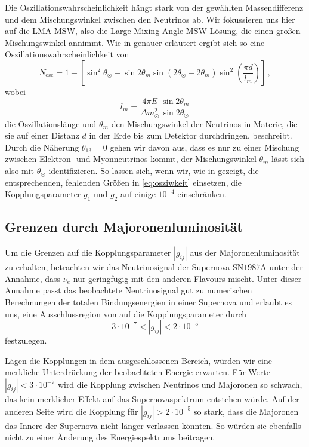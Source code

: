 Die Oszillationswahrscheinlichkeit hängt stark von der gewählten Massendifferenz und dem Mischungswinkel zwischen den Neutrinos ab.
Wir fokussieren uns hier auf die LMA-MSW, also die Large-Mixing-Angle MSW-Lösung, die einen großen Mischungswinkel annimmt.
Wie in \cite{ueberlebenswkeit} genauer erläutert ergibt sich so eine Oszillationswahrscheinlichkeit von
\begin{equation}
    N_\text{osc} = 1 - \left[\sin^2\theta_\odot - \sin 2\theta_m \sin\left(2\theta_\odot - 2 \theta_m\right) \sin^2 \left(\frac{\pi d}{l_m}\right)\right] \,,
    \label{eq:osziwkeit}
\end{equation}
wobei
\begin{equation*}
    l_m = \frac{4 \pi E}{\Delta m^2_\odot} \frac{\sin2\theta_m}{\sin2\theta_\odot}
\end{equation*}
die Oszillationslänge und $\theta_m$ den Mischungswinkel der Neutrinos in Materie, die sie auf einer Distanz $d$ in der Erde bis zum Detektor durchdringen, beschreibt.
Durch die Näherung $\theta_{1 3} = 0$ gehen wir davon aus, dass es nur zu einer Mischung zwischen Elektron- und Myonneutrinos kommt, der Mischungswinkel $\theta_m$ lässt sich also mit $\theta_\odot$ identifizieren.
So lassen sich, wenn wir, wie in \cite{supernovaboundsdasandere} gezeigt, die entsprechenden, fehlenden Größen in \eqref{eq:osziwkeit} einsetzen, die Kopplungsparameter $g_1$ und $g_2$ auf einige $10^{-4}$ einschränken.

\subsection{Grenzen durch Majoronenluminosität}

Um die Grenzen auf die Kopplungsparameter $|g_{i j}|$ aus der Majoronenluminosität zu erhalten, betrachten wir das Neutrinosignal der Supernova SN$1987$A unter der Annahme, dass $\nu_e$ nur geringfügig mit den anderen Flavours mischt.
Unter dieser Annahme passt das beobachtete Neutrinosignal gut zu numerischen Berechnungen der totalen Bindungsenergien in einer Supernova und erlaubt es uns, eine Ausschlussregion von auf die Kopplungsparameter durch
\begin{equation}
    3 \cdot 10^{-7} < |g_{i j}| < 2 \cdot 10^{-5} %
    \label{eq:gijlimit}
\end{equation}
festzulegen.

Lägen die Kopplungen in dem ausgeschlossenen Bereich, würden wir eine merkliche Unterdrückung der beobachteten Energie erwarten.
Für Werte $|g_{i j}| < 3 \cdot 10^{-7}$ wird die Kopplung zwischen Neutrinos und Majoronen so schwach, das kein merklicher Effekt auf das Supernovaspektrum entstehen würde. %
Auf der anderen Seite wird die Kopplung für $|g_{i j}| > 2 \cdot 10^{-5}$ so stark, dass die Majoronen das Innere der Supernova nicht länger verlassen könnten. %
So würden sie ebenfalls nicht zu einer Änderung des Energiespektrums beitragen.


